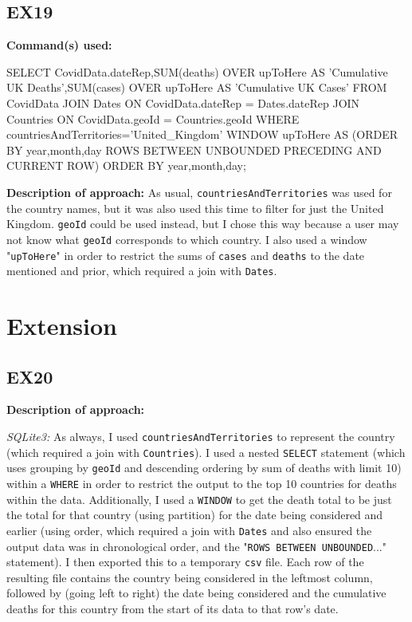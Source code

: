 \documentclass{article}
\begin{document}
\subsection{EX19}

\textbf{Command(s) used:}
\begin{spverbatim}
    SELECT CovidData.dateRep,SUM(deaths) OVER upToHere AS 'Cumulative UK Deaths',SUM(cases) OVER upToHere AS 'Cumulative UK Cases'
    FROM CovidData
        JOIN Dates
            ON CovidData.dateRep = Dates.dateRep
        JOIN Countries
            ON CovidData.geoId = Countries.geoId
    WHERE countriesAndTerritories='United_Kingdom'
    WINDOW upToHere AS (ORDER BY year,month,day ROWS BETWEEN UNBOUNDED PRECEDING AND CURRENT ROW)
    ORDER BY year,month,day;
\end{spverbatim}

\textbf{Description of approach:}
As usual, \verb|countriesAndTerritories| was used for the country names, but it was also used this time to filter for just the United Kingdom. \verb|geoId| could be used instead, but I chose this way because a user may not know what \verb|geoId| corresponds to which country. I also used a window "\verb|upToHere|" in order to restrict the sums of \verb|cases| and \verb|deaths| to the date mentioned and prior, which required a join with \verb|Dates|.

\section{Extension}

\subsection{EX20}
\textbf{Description of approach:}\newline

\textit{SQLite3:}
As always, I used \verb|countriesAndTerritories| to represent the country (which required a join with \verb|Countries|). I used a nested \verb|SELECT| statement (which uses grouping by \verb|geoId| and descending ordering by sum of deaths with limit 10) within a \verb|WHERE| in order to restrict the output to the top 10 countries for deaths within the data. Additionally, I used a \verb|WINDOW| to get the death total to be just the total for that country (using partition) for the date being considered and earlier (using order, which required a join with \verb|Dates| and also ensured the output data was in chronological order, and the "\verb|ROWS BETWEEN UNBOUNDED|..." statement). I then exported this to a temporary \verb|csv| file. Each row of the resulting file contains the country being considered in the leftmost column, followed by (going left to right) the date being considered and the cumulative deaths for this country from the start of its data to that row's date.\newline
\end{document}

